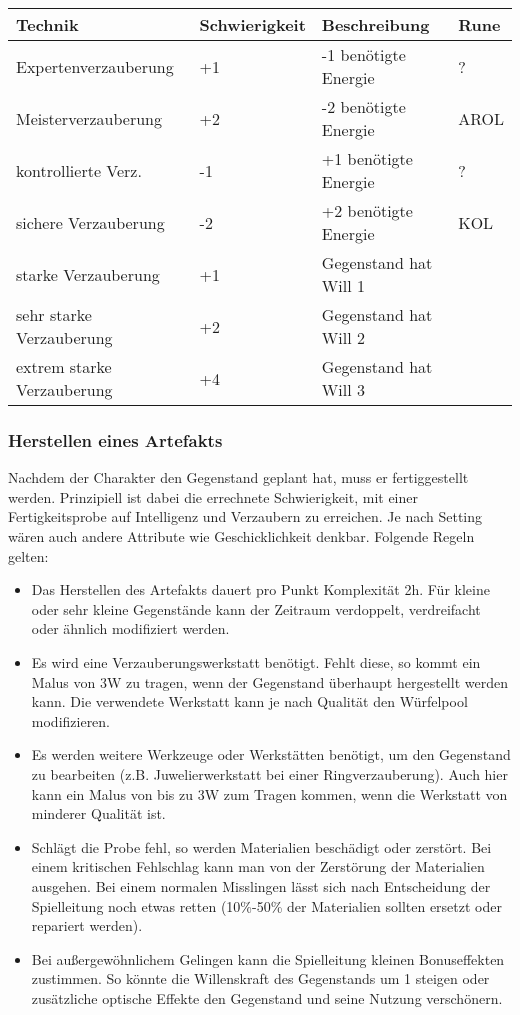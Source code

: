 \documentclass{article}
\begin{document}
\begin{small}
\begin{tabular}{|m{4cm}|m{3cm}|m{4cm}|m{2cm}|}
\hline
\textbf{Technik}&\textbf{Schwierigkeit}&\textbf{Beschreibung}&\textbf{Rune}\\
\hline
\hline
Expertenverzauberung&+1&-1 benötigte Energie&?\\
\hline
Meisterverzauberung&+2&-2 benötigte Energie&AROL\\
\hline
kontrollierte Verz.&-1&+1 benötigte Energie&?\\
\hline
sichere Verzauberung&-2&+2 benötigte Energie&KOL\\
\hline
starke Verzauberung&+1&Gegenstand hat Will 1&\\
\hline
sehr starke Verzauberung&+2&Gegenstand hat Will 2&\\
\hline
extrem starke Verzauberung&+4&Gegenstand hat Will 3&\\
\hline
\end{tabular}
\end{small}

\subsubsection{Herstellen eines Artefakts}

Nachdem der Charakter den Gegenstand geplant hat, muss er fertiggestellt werden. Prinzipiell ist dabei die
errechnete Schwierigkeit, mit einer Fertigkeitsprobe auf Intelligenz und Verzaubern zu erreichen. Je nach Setting
wären auch andere Attribute wie Geschicklichkeit denkbar. Folgende Regeln gelten:

\begin{itemize}
\item Das Herstellen des Artefakts dauert pro Punkt Komplexität 2h. Für kleine oder sehr kleine Gegenstände kann der Zeitraum verdoppelt, verdreifacht oder ähnlich modifiziert werden.
\item Es wird eine Verzauberungswerkstatt benötigt. Fehlt diese, so kommt ein Malus von 3W zu tragen, wenn der Gegenstand überhaupt hergestellt werden kann. Die verwendete Werkstatt kann je nach Qualität den Würfelpool modifizieren.
\item Es werden weitere Werkzeuge oder Werkstätten benötigt, um den Gegenstand zu bearbeiten (z.B. Juwelierwerkstatt bei einer Ringverzauberung). Auch hier kann ein Malus von bis zu 3W zum Tragen kommen, wenn die Werkstatt von minderer Qualität ist.
\item Schlägt die Probe fehl, so werden Materialien beschädigt oder zerstört. Bei einem kritischen Fehlschlag kann man von der Zerstörung der Materialien ausgehen. Bei einem normalen Misslingen lässt sich nach Entscheidung der Spielleitung noch etwas retten (10\%-50\% der Materialien sollten ersetzt oder repariert werden).
\item Bei außergewöhnlichem Gelingen kann die Spielleitung kleinen Bonuseffekten zustimmen. So könnte die Willenskraft des Gegenstands um 1 steigen oder zusätzliche optische Effekte den Gegenstand und seine Nutzung verschönern.
\end{itemize}
\end{document}
